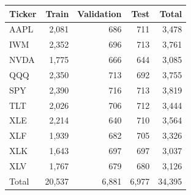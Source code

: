 \begin{tabular}{lrrrr}
\toprule
Ticker & Train & Validation & Test & Total \\
\midrule
AAPL & 2,081 & 686 & 711 & 3,478 \\
IWM & 2,352 & 696 & 713 & 3,761 \\
NVDA & 1,775 & 666 & 644 & 3,085 \\
QQQ & 2,350 & 713 & 692 & 3,755 \\
SPY & 2,390 & 716 & 713 & 3,819 \\
TLT & 2,026 & 706 & 712 & 3,444 \\
XLE & 2,214 & 640 & 710 & 3,564 \\
XLF & 1,939 & 682 & 705 & 3,326 \\
XLK & 1,643 & 697 & 697 & 3,037 \\
XLV & 1,767 & 679 & 680 & 3,126 \\
Total & 20,537 & 6,881 & 6,977 & 34,395 \\
\bottomrule
\end{tabular}
